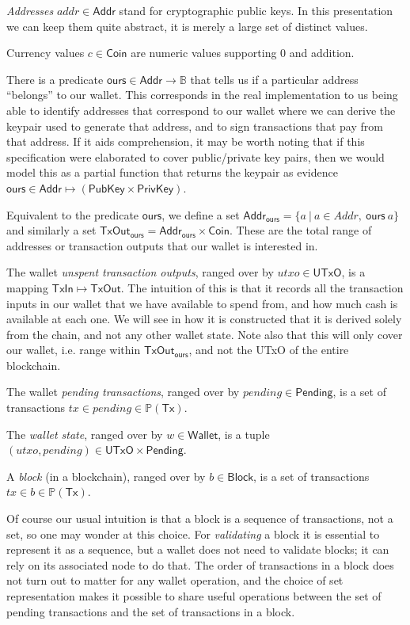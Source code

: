 \documentclass{article}
\newcommand{\powerset}[1]{\mathbb{P}(#1)}
\begin{document}
\emph{Addresses} $addr \in \mathsf{Addr}$ stand for cryptographic public keys. In this
presentation we can keep them quite abstract, it is merely a large set of
distinct values.

Currency values $c \in \mathsf{Coin}$ are numeric values supporting 0 and addition.

There is a predicate $\mathsf{ours} \in \mathsf{Addr} \to \mathbb{B}$
that tells us if a particular address ``belongs'' to our wallet.
This corresponds in the real implementation to us being able to identify
addresses that correspond to our wallet where we can derive the keypair used
to generate that address, and to sign transactions that pay from that address.
If it aids comprehension, it may be worth noting that if this specification
were elaborated to cover public/private key pairs, then we would model this as
a partial function that returns the keypair as evidence
$\mathsf{ours} \in \mathsf{Addr} \mapsto (\mathsf{PubKey} \times \mathsf{PrivKey})$.

Equivalent to the predicate $\mathsf{ours}$, we define a set
$\mathsf{Addr_{ours}} = \{ a ~|~ a \in Addr, ~ \mathsf{ours} ~ a \}$ and
similarly a set
$\mathsf{TxOut_{ours}} = \mathsf{Addr_{ours}} \times \mathsf{Coin}$. These are
the total range of addresses or transaction outputs that our wallet is
interested in.

The wallet \emph{unspent transaction outputs}, ranged over by
$utxo \in \mathsf{UTxO}$, is a mapping $\mathsf{TxIn} \mapsto \mathsf{TxOut}$.
The intuition of this is that it records all the transaction inputs in our
wallet that we have available to spend from, and how much cash is available at
each one. We will see in how it is constructed that it is derived solely from
the chain, and not any other wallet state. Note also that this will only cover
our wallet, i.e. range within $\mathsf{TxOut_{ours}}$, and not the UTxO of the
entire blockchain.

The wallet \emph{pending transactions}, ranged over by
$pending \in \mathsf{Pending}$, is a set of transactions
$tx \in pending \in \powerset{\mathsf{Tx}}$.

The \emph{wallet state}, ranged over by $w \in \mathsf{Wallet}$, is a tuple
$(utxo, pending) \in \mathsf{UTxO} \times \mathsf{Pending}$.

A \emph{block} (in a blockchain), ranged over by $b \in \mathsf{Block}$, is a
set of transactions $tx \in b \in \powerset{\mathsf{Tx}}$.

Of course our usual intuition is that a block is a sequence of transactions,
not a set, so one may wonder at this choice. For \emph{validating} a block it
is essential to represent it as a sequence, but a wallet does not need to
validate blocks; it can rely on its associated node to do that. The order of
transactions in a block does not turn out to matter for any wallet operation,
and the choice of set representation makes it possible to share useful
operations between the set of pending transactions and the set of transactions
in a block.
\end{document}
